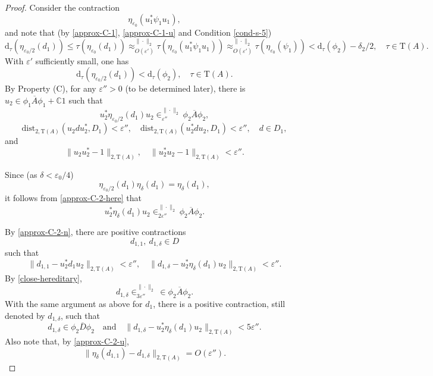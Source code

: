 \documentclass[10pt,a4paper]{amsart}
\newcommand{\Comp}{\mathbb C}
\newcommand{\eps}{\varepsilon}
\newcommand{\norm}[1]{\| #1\|}
\newcommand{\tr}{\mathrm{T}}
\begin{document}
\begin{proof}
Consider  the contraction
$$\eta_{\eps_0}(u^*_1\psi_1 u_1),$$
and note that (by \eqref{approx-C-1}, \eqref{approx-C-1-u} and Condition \eqref{cond-s-5})
$$ \mathrm{d}_\tau( \eta_{\eps_0/2}(d_1) ) \leq \tau(\eta_{\eps_0}(d_1))  \approx_{O(\eps')}^{\norm{\cdot}_2}  \tau( \eta_{\eps_0}(u^*_1\psi_1 u_1) ) \approx_{O(\eps')}^{\norm{\cdot}_2} \tau( \eta_{\eps_0}(\psi_1) ) < \mathrm{d}_\tau(\phi_2) - \delta_2/2,\quad \tau \in \tr(A).$$
With $\eps'$ sufficiently small, one has 
$$\mathrm{d}_\tau(\eta_{\eps_0/2}(d_1)) < \mathrm{d}_\tau(\phi_2),\quad \tau \in \tr(A).$$ 
By Property (C), for any $\eps''>0$ (to be determined later), there is $u_2 \in \overline{\phi_1 A \phi_1}+\Comp 1$ such that 
\begin{equation}\label{approx-C-2-here}
u^*_2 \eta_{\eps_0/2}(d_1) u_2 \in^{\norm{\cdot}_2}_{\eps''} \overline{\phi_2 A \phi_2},
\end{equation}
\begin{equation}\label{approx-C-2-n}
\mathrm{dist}_{2, \tr(A)}(u_2 d u^*_2, D_1) < \eps'', \quad \mathrm{dist}_{2, \tr(A)}(u_2^*du_2, D_1) < \eps'',\quad d \in D_1,
\end{equation}
and
\begin{equation}\label{approx-C-2-u}
\norm{u_2u_2^* - 1}_{2, \tr(A)},\quad  \norm{u_2^*u_2 - 1}_{2, \tr(A)} < \eps''.
\end{equation}


Since (as $\delta < \eps_0/4$)
$$\eta_{\eps_0/2}(d_1) \eta_\delta(d_1) = \eta_\delta(d_1),$$
it follows from \eqref{approx-C-2-here} that
\begin{equation}\label{close-hereditary}
u_2^* \eta_\delta(d_1) u_2 \in^{\norm{\cdot}_2}_{2\eps''} \overline{\phi_2 A \phi_2}. 
\end{equation}

By \eqref{approx-C-2-n}, there are positive contractions $$ d_{1, 1},\  d_{1, \delta} \in  D $$ such that
\begin{equation}\label{pert-C-step-2}
 \norm{d_{1, 1} - u_2^* d_1 u_2}_{2, \tr(A)} < \eps'',\quad  \norm{d_{1, \delta} - u_2^*\eta_{\delta}(d_1)u_2}_{2, \tr(A)} < \eps''. 
\end{equation}  
 By \eqref{close-hereditary}, $$d_{1, \delta} \in_{3\eps''}^{\norm{\cdot}_2} \in \overline{\phi_2A\phi_2}.$$
 With the same argument as above for $d_1$, there is a positive contraction, still denoted by $ d_{1, \delta}$, such that 
 \begin{equation}\label{u-2-2-approx-C-1}
 d_{1, \delta} \in \overline{\phi_2 D \phi_2}\quad \mathrm{and}\quad \norm{d_{1, \delta} - u_2^*\eta_{\delta}(d_1)u_2}_{2, \tr(A)} < 5\eps''.
 \end{equation}
Also note that, by \eqref{approx-C-2-u}, $$ \norm{ \eta_\delta(d_{1, 1}) - d_{1, \delta} }_{2, \tr(A)} = O(\eps''). $$


\end{proof}
\end{document}
